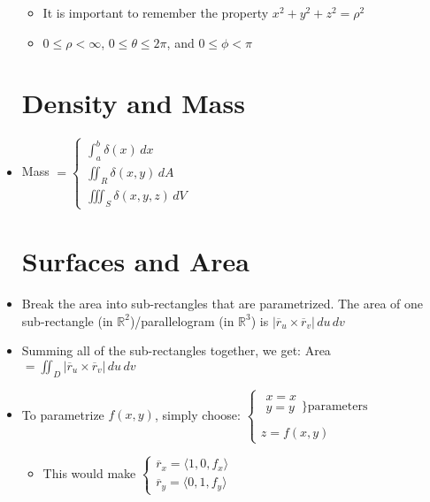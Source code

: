 \begin{itemize}
\begin{itemize}
        \item It is important to remember the property $x^2 + y^2 + z^2 = \rho^2$

          \item $0\leq \rho < \infty$, $0\leq\theta\leq2\pi$, and $0 \leq \phi < \pi$

      \end{itemize}

      \section{Density and Mass}

    \item Mass $=\left\{\begin{array}{l} \displaystyle \int_a^b \delta(x)\,dx \\ \displaystyle \iint_R \delta(x,y)\,dA\\ \displaystyle \iiint_S \delta(x,y,z)\,dV \end{array}$

\section{Surfaces and Area}

    \item Break the area into sub-rectangles that are parametrized. The area of one sub-rectangle (in $\mathbb{R}^2$)/parallelogram (in $\mathbb{R}^3$) is $|\overline{r}_u\times\overline{r}_v|\,du\,dv$

    \item Summing all of the sub-rectangles together, we get: Area $=\displaystyle\iint_D |\overline{r}_u\times\overline{r}_v|\,du\,dv$

    \item To parametrize $f(x,y)$, simply choose: $\left\{\begin{array}{l} \begin{array}{l} x=x\\y=y\\\end{array}\Big\}\text{parameters}\\ z = f(x,y)\end{array}$

      \begin{itemize}

        \item This would make $\left\{\begin{array}{l} \overline{r}_x=\langle 1, 0, f_x \rangle\\ \overline{r}_y= \langle 0, 1, f_y\rangle \end{array}$


\end{itemize}
\end{itemize}
